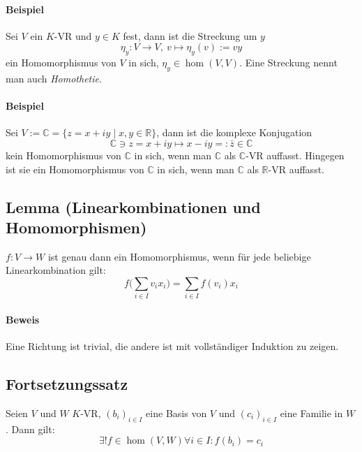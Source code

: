  	\paragraph{Beispiel}
 		Sei $ V $ ein $ K $-VR und $y\in K$ fest, dann ist die Streckung um $y$
 		\[
 			\eta_y:V\to V,\ v\mapsto \eta_y(v) := vy
 		\]
 		ein Homomorphismus von $ V $ in sich, $\eta_y\in \hom(V,V)$. Eine Streckung nennt man auch \emph{Homothetie}.

 	\paragraph{Beispiel}
 		Sei $V := \mathbb{C} = \{z = x+iy\mid x,y\in \mathbb{R}\}$, dann ist die komplexe Konjugation
 		\[
 			\mathbb{C}\ni z = x+iy \mapsto x-iy =: \bar{z} \in \mathbb{C}
 		\]
 		kein Homomorphismus von $\mathbb{C}$ in sich, wenn man $\mathbb{C}$ als $\mathbb{C}$-VR auffasst. Hingegen ist sie ein Homomorphismus von $\mathbb{C}$ in sich, wenn man $\mathbb{C}$ als $ \mathbb{R} $-VR auffasst.

 \subsection{Lemma (Linearkombinationen und Homomorphismen)}
 	\begin{Lemma}
 		$f:V\to W$ ist genau dann ein Homomorphismus, wenn für jede beliebige Linearkombination gilt:
 		\begin{equation*}
 			f\Big(\sum_{i\in I}v_ix_i\Big) = \sum_{i\in I}f(v_i)x_i
 		\end{equation*}
 	\end{Lemma}

 	\paragraph{Beweis}
 		Eine Richtung ist trivial, die andere ist mit vollständiger Induktion zu zeigen.

 \subsection{Fortsetzungssatz}
 	\begin{Satz}[Fortsetzungssatz]
 		Seien $ V $ und $ W $ $K$-VR, $(b_i)_{i\in I}$ eine Basis von $ V $ und $(c_i)_{i\in I}$ eine Familie in $ W $.
 		Dann gilt:
 		\begin{equation*}
 			\exists!f\in \hom(V,W) \forall i\in I: f(b_i) = c_i
 		\end{equation*}
 	\end{Satz}

